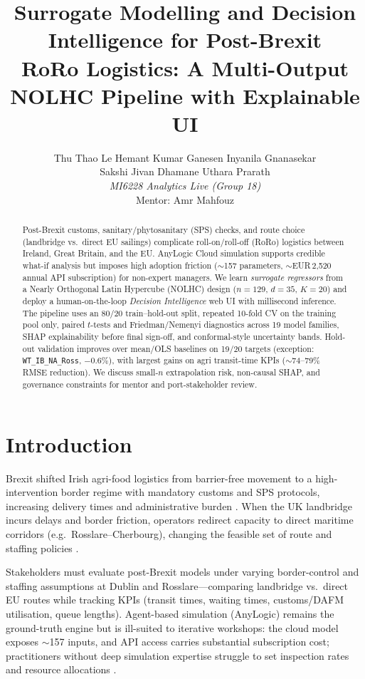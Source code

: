 \documentclass[10pt,twocolumn]{article}
\title{Surrogate Modelling and Decision Intelligence for Post-Brexit\\RoRo Logistics: A Multi-Output NOLHC Pipeline with Explainable UI}
\author{%
  \begin{tabular}{c}
    Thu Thao Le \quad Hemant Kumar Ganesen \quad Inyanila Gnanasekar \\
    Sakshi Jivan Dhamane \quad Uthara Prarath \\[0.4em]
    \textit{MI6228 Analytics Live (Group 18)} \\
    Mentor: Amr Mahfouz
  \end{tabular}%
}
\date{}
\begin{document}
\maketitle

\begin{abstract}
Post-Brexit customs, sanitary/phytosanitary (SPS) checks, and route choice (landbridge vs.\ direct EU sailings) complicate roll-on/roll-off (RoRo) logistics between Ireland, Great Britain, and the EU.
AnyLogic Cloud simulation supports credible what-if analysis but imposes high adoption friction (${\sim}$157 parameters, ${\sim}$EUR\,2{,}520 annual API subscription) for non-expert managers.
We learn \emph{surrogate regressors} from a Nearly Orthogonal Latin Hypercube (NOLHC) design ($n{=}129$, $d{=}35$, $K{=}20$) and deploy a human-on-the-loop \emph{Decision Intelligence} web UI with millisecond inference.
The pipeline uses an 80/20 train--hold-out split, repeated 10-fold CV on the training pool only, paired $t$-tests and Friedman/Nemenyi diagnostics across 19 model families, SHAP explainability before final sign-off, and conformal-style uncertainty bands.
Hold-out validation improves over mean/OLS baselines on 19/20 targets (exception: \texttt{WT\_IB\_NA\_Ross}, $-0.6\%$), with largest gains on agri transit-time KPIs (${\sim}$74--79\% RMSE reduction).
We discuss small-$n$ extrapolation risk, non-causal SHAP, and governance constraints for mentor and port-stakeholder review.
\end{abstract}

\section{Introduction}
\label{sec:intro}

Brexit shifted Irish agri-food logistics from barrier-free movement to a high-intervention border regime with mandatory customs and SPS protocols, increasing delivery times and administrative burden \citep{mahfouz2019,brexitlegal_sps,mahfouz2020}.
When the UK landbridge incurs delays and border friction, operators redirect capacity to direct maritime corridors (e.g.\ Rosslare--Cherbourg), changing the feasible set of route and staffing policies \citep{copenhagen2018,ivanov2025}.

Stakeholders must evaluate post-Brexit models under varying border-control and staffing assumptions at Dublin and Rosslare---comparing landbridge vs.\ direct EU routes while tracking KPIs (transit times, waiting times, customs/DAFM utilisation, queue lengths).
Agent-based simulation (AnyLogic) remains the ground-truth engine but is ill-suited to iterative workshops: the cloud model exposes ${\sim}$157 inputs, and API access carries substantial subscription cost; practitioners without deep simulation expertise struggle to set inspection rates and resource allocations \citep{byrne2009,amroune2019}.
\end{document}
